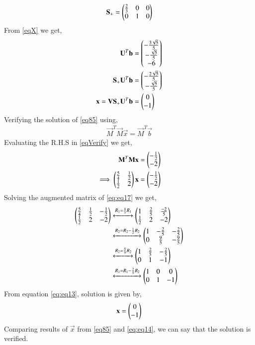 \documentclass[journal,12pt,twocolumn]{IEEEtran}
\begin{document}
\begin{align}
\mathbf{S_+} = \begin{pmatrix}\frac{2}{3}&0&0\\0&1&0\end{pmatrix}
\end{align}
From \eqref{eqX} we get,
\begin{align}
\mathbf{U}^T\mathbf{b}&=\begin{pmatrix}-\frac{3\sqrt{5}}{5}\\-\frac{\sqrt{5}}{5}\\-6\end{pmatrix}\\
\mathbf{S_+}\mathbf{U}^T\mathbf{b}&=\begin{pmatrix}-\frac{2\sqrt{5}}{5}\\-\frac{\sqrt{5}}{5}\end{pmatrix}\\
\mathbf{x} = \mathbf{V}\mathbf{S_+}\mathbf{U}^T\mathbf{b} &= \begin{pmatrix}0\\-1\end{pmatrix}\label{eq85}
\end{align}
Verifying the solution of \eqref{eq85} using,
\begin{align}
\vec{M}^T\vec{M}\vec{x} = \vec{M}^T\vec{b}\label{eqVerify}
\end{align}
Evaluating the R.H.S in \eqref{eqVerify} we get,
\begin{align}
\mathbf{M}^T\mathbf{M}\mathbf{x} &= \begin{pmatrix}-\frac{1}{2}\\-2\end{pmatrix}\\
\implies\begin{pmatrix}\frac{5}{4}&\frac{1}{2}\\\frac{1}{2}&2\end{pmatrix}\mathbf{x} &= \begin{pmatrix}-\frac{1}{2}\\{-2}\end{pmatrix}\label{eq:eq17}
\end{align}
Solving the augmented matrix of \eqref{eq:eq17} we get,
\begin{align}
\begin{pmatrix}\frac{5}{4}&\frac{1}{2}&-\frac{1}{2}\\\frac{1}{2}&2&-2\end{pmatrix} &\xleftrightarrow{R_1=\frac{4}{5}R_1}\begin{pmatrix}1&\frac{2}{5}&\frac{-2}{5}\\\frac{1}{2}&2&-2\end{pmatrix}\\
&\xleftrightarrow{R_2=R_2-\frac{1}{2}R_2}\begin{pmatrix}1&-\frac{2}{5}&-\frac{2}{5}\\0&\frac{9}{5}&-\frac{9}{5}\end{pmatrix}\\
&\xleftrightarrow{R_2=\frac{5}{9}R_2}\begin{pmatrix}1&\frac{2}{5}&-\frac{2}{5}\\0&1&-1\end{pmatrix}\\
&\xleftrightarrow{R_1=R_1-\frac{2}{5}R_2}\begin{pmatrix}1&0&0\\0&1&-1\end{pmatrix}\label{eq:eq13}
\end{align}
From equation \eqref{eq:eq13}, solution is given by,
\begin{align}\label{eq:eq14}
\mathbf{x}=\begin{pmatrix}0\\-1\end{pmatrix}
\end{align}
Comparing results of $\vec{x}$ from \eqref{eq85} and \eqref{eq:eq14}, we can say that the solution is verified.
\end{document}
